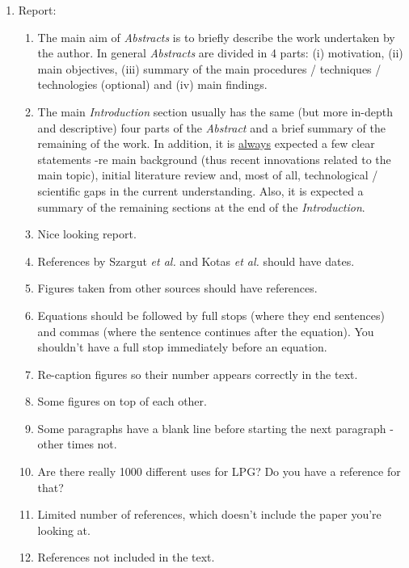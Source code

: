 \documentclass[14pt,twoside]{report}
\begin{document}
\begin{enumerate}

\item Report:
\begin{enumerate}
%
\item The main aim of {\it Abstracts} is to briefly describe the work undertaken by the author. In general {\it Abstracts} are divided in 4 parts: (i) motivation, (ii) main objectives, (iii) summary of the main procedures / techniques / technologies (optional) and (iv) main findings. 
%
\item The main {\it Introduction} section usually has the same (but more in-depth and descriptive) four parts of the {\it Abstract} and a brief summary of the remaining of the work. In addition, it is \underline{always} expected a few clear statements -re main background (thus recent innovations related to the main topic), initial literature review and, most of all, technological / scientific gaps in the current understanding. Also, it is expected a summary of the remaining sections at the end of the {\it Introduction}.
%
\item Nice looking report.
%
\item References by Szargut {\it et al.} and Kotas {\it et al.} should have dates.
%
\item Figures taken from other sources should have references.
%
\item Equations should be followed by full stops (where they end sentences) and commas (where the sentence continues after the equation). You shouldn't have a full stop immediately before an equation.
%
\item Re-caption figures so their number appears correctly in the text.
%
\item Some figures on top of each other.
%
\item Some paragraphs have a blank line before starting the next paragraph - other times not.
%
\item Are there really 1000 different uses for LPG? Do you have a reference for that?
%
\item Limited number of references, which doesn't include the paper you're looking at. 
%
\item References not included in the text.

\end{enumerate}
\end{enumerate}
\end{document}
